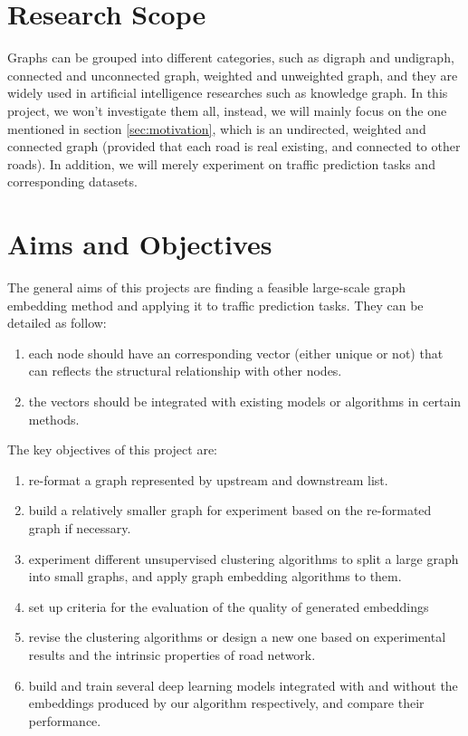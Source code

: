 \documentclass[11pt]{article}
\begin{document}
\section{Research Scope}
Graphs can be grouped into different categories, such as digraph and undigraph,  connected and unconnected graph, weighted and unweighted graph, and they are widely used in artificial intelligence researches such as knowledge graph. In this project, we won't investigate them all, instead, we will mainly focus on the one mentioned in section \ref{sec:motivation}, which is an undirected, weighted and connected graph (provided that each road is real existing, and connected to other roads). In addition, we will merely experiment on traffic prediction tasks and corresponding datasets. 

\section{Aims and Objectives}
The general aims of this projects are finding a feasible large-scale graph embedding method and applying it to traffic prediction tasks. They can be detailed as follow:
\begin{enumerate}
  \item each node should have an corresponding vector (either unique or not) that can reflects the structural relationship with other nodes.
  \item the vectors should be integrated with existing models or algorithms in certain methods.
\end{enumerate}
The key objectives of this project are:
\begin{enumerate}
  \item re-format a graph represented by upstream and downstream list.
  \item build a relatively smaller graph for experiment based on the re-formated graph if necessary.
  \item experiment different unsupervised clustering algorithms to split a large graph into small graphs, and apply graph embedding algorithms to them.
  \item set up criteria for the evaluation of the quality of generated embeddings
  \item revise the clustering algorithms or design a new one based on experimental results and the intrinsic properties of road network.
  \item build and train several deep learning models integrated with and without the embeddings produced by our algorithm respectively, and compare their performance.
\end{enumerate}

\newpage


\end{document}
